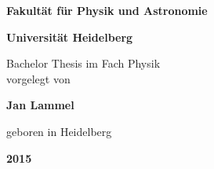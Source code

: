 \begin{titlepage}

	\begin{center}
	
		\textbf{Fakultät für Physik und Astronomie} \\
		
		\vspace{0.5cm}
		
		\textbf{Universität Heidelberg}
		
		
		\vfill
		
		
		Bachelor Thesis im Fach Physik \\
		
		vorgelegt von \\
		
		\vspace{1cm}
		
		\textbf{Jan Lammel} \\
		
		
		\vspace{1cm}
		
		geboren in Heidelberg \\
		
		\vspace{0.7cm}
		
		\textbf{2015}
	
	
	\end{center}        


\end{titlepage}


\newpage